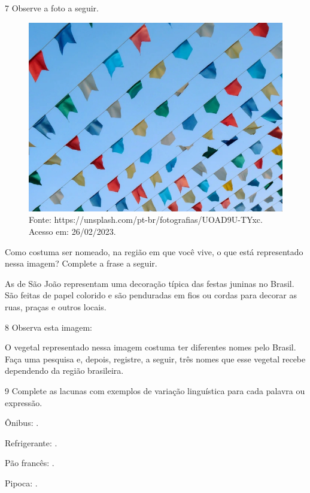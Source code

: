

\num{7} Observe a foto a seguir.

\begin{figure}[htpb!]
\includegraphics[width=.5\textwidth]{./imgs/img19.jpg}
\caption{Fonte: https://unsplash.com/pt-br/fotografias/UOAD9U-TYxc. Acesso em: 26/02/2023.}
\end{figure}


Como costuma ser nomeado, na região em que você vive, o que está representado nessa imagem?
Complete a frase a seguir.

As \preencher \preencher \preencher de São João representam uma decoração típica das
festas juninas no Brasil. São feitas de papel colorido e são penduradas
em fios ou cordas para decorar as ruas, praças e outros locais.



\num{8} Observa esta imagem:


O vegetal representado nessa imagem costuma ter diferentes nomes pelo Brasil.
Faça uma pesquisa e, depois, registre, a seguir, três nomes que esse vegetal recebe dependendo da região brasileira.



\num{9} Complete as lacunas com exemplos de variação linguística para cada palavra ou expressão.

\begin{escolha}
\item Ônibus: \preencher \preencher. 

\item Refrigerante: \preencher \preencher. 

\item Pão francês: \preencher \preencher. 

\item Pipoca: \preencher \preencer. 
\end{escolha}


